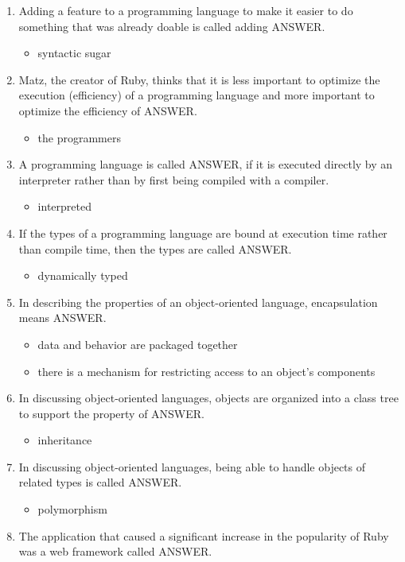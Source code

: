 \documentclass{exam}
\begin{document}
\begin{enumerate}
\item Adding a feature to a programming language to make it easier to do something that was already doable is called adding ANSWER.
\begin{itemize}
\item syntactic sugar
\end{itemize}
\item Matz, the creator of Ruby, thinks that it is less important to optimize the execution (efficiency) of a programming language and more important to optimize the efficiency of ANSWER.
\begin{itemize}
\item the programmers
\end{itemize}
\item A programming language is called ANSWER, if it is executed directly by an interpreter rather than by first being compiled with a compiler.
\begin{itemize}
\item interpreted
\end{itemize}
\item If the types of a programming language are bound at execution time rather than compile time, then the types are called ANSWER.
\begin{itemize}
\item dynamically typed
\end{itemize}
\item In describing the properties of an object-oriented language, encapsulation means ANSWER.
\begin{itemize}
\item data and behavior are packaged together
\item there is a mechanism for restricting access to an object's components
\end{itemize}
\item In discussing object-oriented languages, objects are organized into a class tree to support the property of ANSWER.
\begin{itemize}
\item inheritance
\end{itemize}
\item In discussing object-oriented languages, being able to handle objects of related types is called ANSWER.
\begin{itemize}
\item polymorphism
\end{itemize}
\item The application that caused a significant increase in the popularity of Ruby was a web framework called ANSWER.

\end{enumerate}
\end{document}
